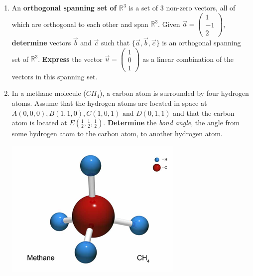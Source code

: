 \documentclass[12pt]{book}
\begin{document}
\begin{enumerate}

\newpage

\item An \textbf{orthogonal spanning set of $\mathbb{R}^3$} is a set of 3 non-zero vectors, all of which are orthogonal to each other and span $\mathbb{R}^3$. Given $\vec{a} = \left(\begin{smallmatrix} 1 \\ -1 \\ 2 \end{smallmatrix}\right)$, \textbf{determine} vectors $\vec{b}$ and $\vec{c}$ such that $\{\vec{a}, \vec{b}, \vec{c}\}$ is an orthogonal spanning set of $\mathbb{R}^3$. \textbf{Express} the vector $\vec{u}= \left(\begin{smallmatrix} 1 \\ 0 \\ 1 \end{smallmatrix}\right)$ as a linear combination of the vectors in this spanning set. 

\newpage

\item In a methane molecule ($CH_4$), a carbon atom is surrounded by four hydrogen atoms. Assume that the hydrogen atoms are located in space at $A(0,0,0), B(1,1,0), C(1,0,1) \textrm{ and } D(0,1,1)$ and that the carbon atom is located at $E\left(\frac{1}{2},\frac{1}{2},\frac{1}{2}\right)$. \textbf{Determine} the \emph{bond angle}, the angle from some hydrogen atom to the carbon atom, to another hydrogen atom.

\includegraphics[scale=2]{Methane.png}



\end{enumerate}
\end{document}
